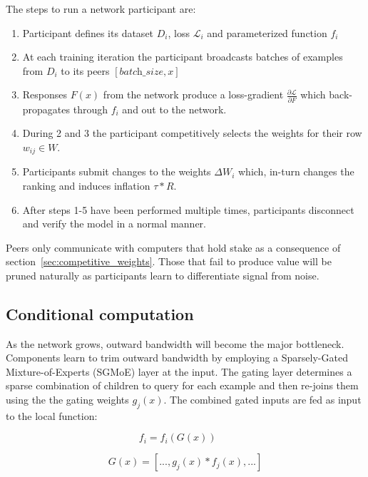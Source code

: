 \documentclass{article}
\begin{document}
The steps to run a network participant are:
\begin{enumerate}
	
	\item Participant defines its dataset $D_i$, loss $\mathcal{L}_i$ and parameterized function $f_i$
	\item  At each training iteration the participant broadcasts batches of examples from $D_i$ to its peers $[\textit{batch\_size}, x]$
	\item Responses $F(x)$ from the network produce a loss-gradient $\frac{\partial \mathcal{L}}{\partial F}$ which back-propagates through $f_i$ and out to the network.
	\item  During 2 and 3 the participant competitively selects the weights for their row $w_{ij} \in W$.
	\item  Participants submit changes to the weights $\Delta W_i$ which, in-turn changes the ranking and induces inflation $\tau * R$.
	\item  {\color{blue} After steps 1-5 have been performed multiple times}, participants disconnect and verify the model in a normal manner.
\end{enumerate}

Peers only communicate with computers that hold stake as a consequence of section~\ref{sec:competitive_weights}. Those that fail to produce value will be pruned naturally as participants learn to differentiate signal from noise.

\subsection{Conditional computation}

As the network grows, outward bandwidth will become the major bottleneck. Components learn to trim outward bandwidth by employing a Sparsely-Gated Mixture-of-Experts (SGMoE) \cite{shazeer2017outrageously} layer at the input. The gating layer determines a sparse combination of children to query for each example and then re-joins them using the the gating weights $g_j(x)$. The combined gated inputs are fed as input to the local function: 

\begin{equation}
f_i = f_i(G(x)) \ \ \ \  \textrm{ }
\end{equation}

\begin{equation}
\label{eq:gating_ensemble}
G(x) = [ ..., g_j(x) * f_j(x), ...]
\end{equation}
\end{document}
